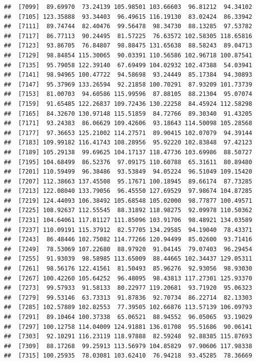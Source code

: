 \documentclass[
]{article}
\begin{document}
\begin{verbatim}
##  [7099]  89.69970  73.24139 105.98501 103.66603  96.81212  94.34102
##  [7105] 123.35888  93.34403  96.49615 116.19130  83.02424  86.33942
##  [7111]  89.74744  82.40476  99.56478  98.34730  88.13285  97.53782
##  [7117]  86.77113  90.24495  81.57225  76.63572 102.58305 118.65816
##  [7123]  93.86705  76.84807  98.88475 131.65638  88.58243  89.04713
##  [7129]  98.84854 115.30065  90.03391 110.56586 102.96718 100.87541
##  [7135]  95.79058 122.39140  67.69499 104.02932 102.47388  54.03941
##  [7141]  98.94965 100.47722  94.58698  93.24449  85.17384  94.30893
##  [7147]  95.37969 133.26594  92.21858 100.70291  87.93209 101.73739
##  [7153]  81.00703  94.60586 115.99596  87.88105  88.21304  95.07074
##  [7159]  91.65485 122.26837 109.72436 130.22258  84.45924 112.58298
##  [7165]  84.32670 130.97148 115.51859  84.72766  89.30340  91.43205
##  [7171]  93.24383  86.06629 109.42606  93.18643 114.50098 105.28568
##  [7177]  97.36653 125.21002 114.27571  89.90415 102.07079  94.39144
##  [7183] 109.99182 116.41743 108.28956  95.92220 102.83848  97.42123
##  [7189] 105.29138  99.69625 104.17137 118.47736 103.69986  88.50727
##  [7195] 104.68499  86.52376  97.09175 110.60788  65.31611  80.89480
##  [7201] 110.59499  96.38486  93.53849  94.05224  96.51049 109.15420
##  [7207] 112.38663 137.45508  95.17671 100.18945  89.66174  87.73285
##  [7213] 122.08040 133.79056  96.45550 127.69529  97.98674 104.87285
##  [7219] 124.44093 106.38492 105.68548 105.02000  98.77877 100.49571
##  [7225] 108.92637 112.55545  88.31892 118.98275  92.09978 110.50362
##  [7231] 104.64061 117.81127 111.85096 103.91706  98.48921 134.03589
##  [7237] 110.09191 115.37912  82.57705 134.29585  94.19040  78.43371
##  [7243]  86.48446 102.75082 114.77266 120.94499  85.02600  93.71416
##  [7249]  78.53069 107.22680  88.97920  91.04145  79.07403  96.29454
##  [7255]  91.93039  98.58985 113.65009  88.44665 102.34437 129.05311
##  [7261]  98.56176 122.41561  81.50493  85.96276  92.93056  98.93030
##  [7267] 100.42260 105.64252  96.48095  98.43813 117.27301 125.93370
##  [7273]  99.57933  91.58133  80.22977 119.20681  93.71920  95.06323
##  [7279]  99.53146  63.73313  91.87836  92.70734  86.22714  82.13303
##  [7285] 102.57889 102.82553  77.39505 102.66876 113.57139 106.09793
##  [7291]  89.10464 100.37338  65.06521  88.94552  96.05065  93.19029
##  [7297] 100.12758 114.04009 124.91881 136.01708  95.51686  90.06141
##  [7303]  92.10291 116.23119 118.97888  82.59248  92.88385 115.87693
##  [7309]  88.17268  99.25913 113.56979 104.85829  97.90606 117.98338
##  [7315] 100.25935  78.03081 103.62410  76.94218  93.45285  78.36669

\end{verbatim}
\end{document}
